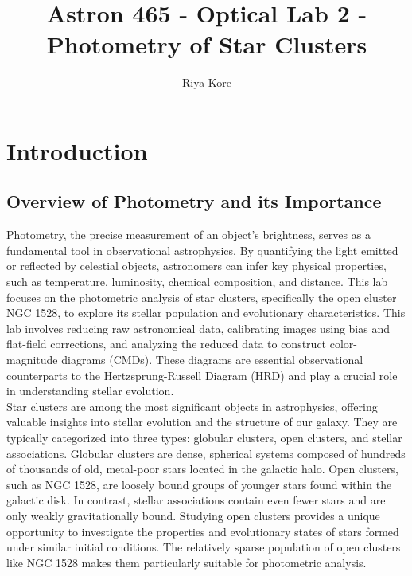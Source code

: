 \documentclass[linenumbers,twocolumn]{aastex631}
\begin{document}
\title{Astron 465 - Optical Lab 2 - Photometry of Star Clusters}



\author[0009-0002-9802-0511]{Riya Kore}

\section{Introduction} \label{sec:introduction}

\subsection{Overview of Photometry and its Importance}

Photometry, the precise measurement of an object's brightness, serves as a fundamental tool in observational astrophysics. By quantifying the light emitted or reflected by celestial objects, astronomers can infer key physical properties, such as temperature, luminosity, chemical composition, and distance. This lab focuses on the photometric analysis of star clusters, specifically the open cluster NGC 1528, to explore its stellar population and evolutionary characteristics. This lab involves reducing raw astronomical data, calibrating images using bias and flat-field corrections, and analyzing the reduced data to construct color-magnitude diagrams (CMDs). These diagrams are essential observational counterparts to the Hertzsprung-Russell Diagram (HRD) and play a crucial role in understanding stellar evolution. \\

Star clusters are among the most significant objects in astrophysics, offering valuable insights into stellar evolution and the structure of our galaxy. They are typically categorized into three types: globular clusters, open clusters, and stellar associations. Globular clusters are dense, spherical systems composed of hundreds of thousands of old, metal-poor stars located in the galactic halo. Open clusters, such as NGC 1528, are loosely bound groups of younger stars found within the galactic disk. In contrast, stellar associations contain even fewer stars and are only weakly gravitationally bound. Studying open clusters provides a unique opportunity to investigate the properties and evolutionary states of stars formed under similar initial conditions. The relatively sparse population of open clusters like NGC 1528 makes them particularly suitable for photometric analysis.
\end{document}
